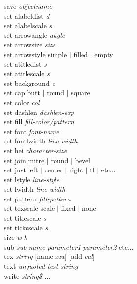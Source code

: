 {\sf save {\it objectname}}   \\
{\sf set alabeldist {\it d}}  \\
{\sf set alabelscale {\it s}}  \\
{\sf set arrowangle {\it angle}}  \\
{\sf set arrowsize {\it size}}  \\
{\sf set arrowstyle simple $|$ filled $|$ empty} \\
{\sf set atitledist {\it s}}  \\
{\sf set atitlescale {\it s}}  \\
{\sf set background {\it c}} \\
{\sf set cap butt $|$ round $|$ square} \\
{\sf set color {\it col}}  \\
{\sf set dashlen {\it dashlen-exp}}  \\
{\sf set fill {\it fill-color/pattern}}  \\
{\sf set font {\it font-name}}  \\
{\sf set fontlwidth {\it line-width}}  \\
{\sf set hei {\it character-size}}  \\
{\sf set join {\sf mitre $|$ round $|$ bevel }}  \\
{\sf set just left $|$ center $|$ right  $|$ tl $|$ etc...}  \\
{\sf set lstyle {\it line-style}}  \\
{\sf set lwidth {\it line-width}}  \\
{\sf set pattern {\it fill-pattern}}  \\
{\sf set texscale scale $|$ fixed $|$ none} \\
{\sf set titlescale {\it s}}  \\
{\sf set ticksscale {\it s}}  \\
{\sf size {\it w} {\it h}}  \\
{\sf sub {\it sub-name parameter1 parameter2} etc...}  \\
{\sf tex {\it string} [name {\it xxx}] [add {\it val}]}  \\
{\sf text {\it unquoted-text-string}}  \\
{\sf write {\it string\$} $\ldots$}

